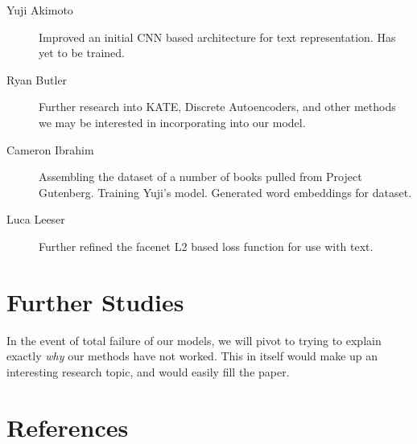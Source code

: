 \documentclass{article}
\begin{document}
\begin{description}

	\item [Yuji Akimoto]
		Improved an initial CNN based architecture for text representation. Has yet to be trained. 

	\item [Ryan Butler]
		Further research into KATE, Discrete Autoencoders, and other methods we may be interested in incorporating into our model.

	\item [Cameron Ibrahim]
		Assembling the dataset of a number of books pulled from Project Gutenberg. Training Yuji's model. Generated word embeddings for dataset.

	\item [Luca Leeser]
		Further refined the facenet L2 based loss function for use with text.

\end{description}

\section{Further Studies}

In the event of total failure of our models, we will pivot to trying to explain exactly \emph{why} our methods have not worked. This in itself would make up an interesting research topic, and would easily fill the paper.
\section{References}
\end{document}
